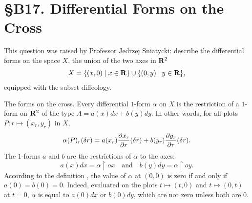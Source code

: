 
\chapter*{\S B17. Differential Forms on the Cross}
\setcounter{footnote}{0}


\begin{abstract}
  We describe the differential forms on the diffeological space consisting of the union of the two axes $ox \cup oy$ in $\RR^2$.
\end{abstract}


This question was raised by Professor Jedrzej Sniatycki:
describe the differential forms on the space $X$,
the union of the two axes in $\RR^2$
$$
  X = \{ (x,0) \mid x \in \mathbf{R}\} \cup \{ (0,y) \mid y \in \mathbf{R}\},
  $$
equipped with the subset diffeology.

\begin{Article}{The forms on the cross.}{}
  Every differential $1$-form $\alpha$ on $X$
  is the restriction of a $1$-form on $\RR^2$ of the type $A = a(x) dx + b(y) dy$.
  In other words,
  for all plots $P \colon r \mapsto (x_r,y_r)$ in $X$,
  $$
    \alpha(P)_r(\delta r) = a(x_r){\partial x_r \over \partial r}(\delta r) +  b(y_r){\partial y_r \over \partial r}(\delta r).
  $$
  The $1$-forms $a$ and $b$ are the restrictions of $\alpha$ to the axes:
  $$
    a(x) dx = \alpha \restriction ox \quad \text{and} \quad b(y) dy = \alpha \restriction oy.
  $$
  \Note According to the definition \cite[\textsection\,6.40]{PIZ13},
  the value of $\alpha$ at $(0,0)$ is zero if and only if $a(0)=b(0)=0$.
  Indeed, evaluated on the plots $t \mapsto (t,0)$
  and $t \mapsto (0,t)$ at $t=0$,
  $\alpha$ is equal to $a(0)dx$ or $b(0)dy$,
  which are not zero
  unless both are $0$.
\end{Article}

